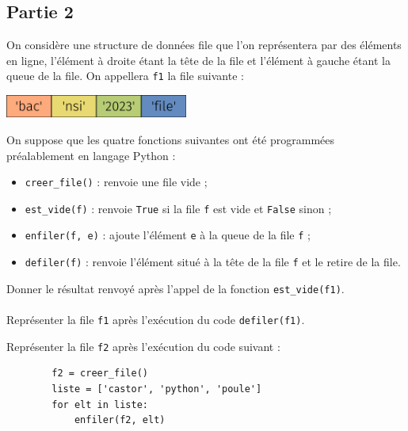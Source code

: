 \documentclass[a4paper,12pt,article,firamath]{nsi}
\begin{document}
\subsection*{Partie 2}

On considère une structure de données file que l'on représentera par des éléments en
ligne, l'élément à droite étant la tête de la file et l'élément à gauche étant la queue de
la file.
On appellera \texttt{f1} la file suivante :
\begin{center}
    \includegraphics[width=6cm]{img/fig02.png}
\end{center}
On suppose que les quatre fonctions suivantes ont été programmées préalablement
en langage Python :
\begin{itemize}
    \item \texttt{creer_file()}  : renvoie une file vide ;
    \item \texttt{est_vide(f)}  : renvoie \texttt{True}  si la file \texttt{f}  est vide et \texttt{False}  sinon ;
    \item \texttt{enfiler(f, e)}  : ajoute l'élément \texttt{e}  à la queue de la file \texttt{f}  ;
    \item \texttt{defiler(f)}  : renvoie l'élément situé à la tête de la file \texttt{f}  et le retire de la file.
\end{itemize}

\question Donner le résultat renvoyé après l'appel de la fonction \texttt{est_vide(f1)}.\\

\\

\question Représenter la file \texttt{f1}  après l'exécution du code \texttt{defiler(f1)}.\\


\question Représenter la file \texttt{f2}  après l'exécution du code suivant :

\begin{pyc}
    \begin{verbatim}
        f2 = creer_file()
        liste = ['castor', 'python', 'poule']
        for elt in liste:
            enfiler(f2, elt)
    \end{verbatim}
\end{pyc}
\end{document}
